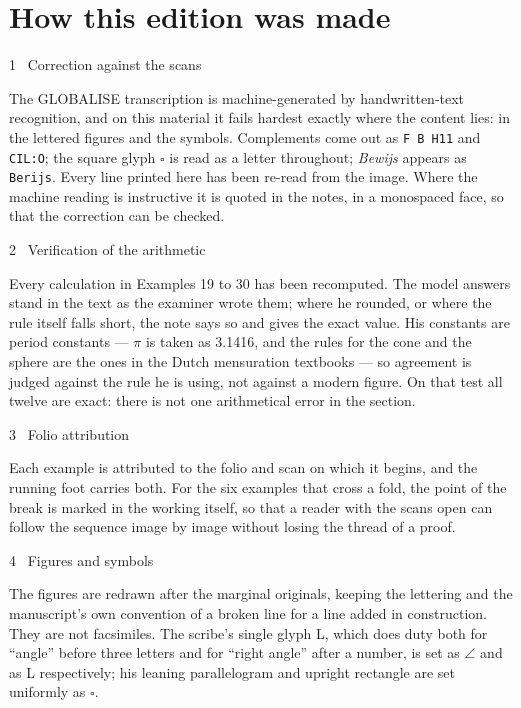 \documentclass[11pt,twoside,openany]{book}
\begin{document}
\chapter*{How this edition was made}
{\color{msred}\large 1 \textperiodcentered\ Correction against the scans}\par\vspace{4pt}
The GLOBALISE transcription is machine-generated by handwritten-text recognition, and on this material it fails hardest exactly where the content lies: in the lettered figures and the symbols. Complements come out as \texttt{F B H11} and \texttt{CIL:O}; the square glyph $\square$ is read as a letter throughout; \textit{Bewijs} appears as \texttt{Berijs}. Every line printed here has been re-read from the image. Where the machine reading is instructive it is quoted in the notes, in a monospaced face, so that the correction can be checked.\par\vspace{10pt}
{\color{msred}\large 2 \textperiodcentered\ Verification of the arithmetic}\par\vspace{4pt}
Every calculation in Examples 19 to 30 has been recomputed. The model answers stand in the text as the examiner wrote them; where he rounded, or where the rule itself falls short, the note says so and gives the exact value. His constants are period constants --- $\pi$ is taken as 3.1416, and the rules for the cone and the sphere are the ones in the Dutch mensuration textbooks --- so agreement is judged against the rule he is using, not against a modern figure. On that test all twelve are exact: there is not one arithmetical error in the section.\par\vspace{10pt}
{\color{msred}\large 3 \textperiodcentered\ Folio attribution}\par\vspace{4pt}
Each example is attributed to the folio and scan on which it begins, and the running foot carries both. For the six examples that cross a fold, the point of the break is marked in the working itself, so that a reader with the scans open can follow the sequence image by image without losing the thread of a proof.\par\vspace{10pt}
{\color{msred}\large 4 \textperiodcentered\ Figures and symbols}\par\vspace{4pt}
The figures are redrawn after the marginal originals, keeping the lettering and the manuscript's own convention of a broken line for a line added in construction. They are not facsimiles. The scribe's single glyph L, which does duty both for ``angle'' before three letters and for ``right angle'' after a number, is set as $\angle$ and as L respectively; his leaning parallelogram and upright rectangle are set uniformly as $\square$.\par\vspace{10pt}
\end{document}
